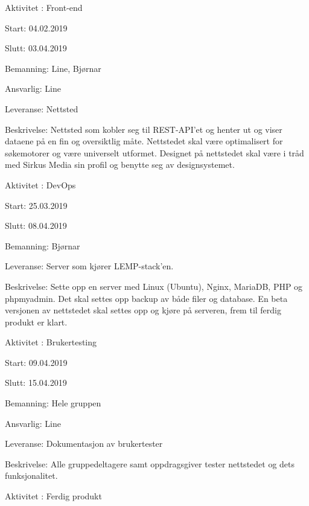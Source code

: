 \documentclass[11pt,a4paper]{report}
\begin{document}
\begin{compactdesc}
\begin{compactitem}
	\addtocounter{aktivitetTeller}{1}
	\end{compactitem}
	\item [Aktivitet \arabic{aktivitetTeller}:] Front-end
	\begin{compactitem}
	\item Start: 04.02.2019
	\item Slutt: 03.04.2019
	\item Bemanning: Line, Bjørnar
	\item Ansvarlig: Line
	\item Leveranse: Nettsted
	\item Beskrivelse: Nettsted som kobler seg til REST-API'et og henter ut og viser dataene på en fin og oversiktlig måte. Nettstedet skal være optimalisert for søkemotorer og være universelt utformet. Designet på nettstedet skal være i tråd med Sirkus Media sin profil og benytte seg av designsystemet.
	\addtocounter{aktivitetTeller}{1}
	\end{compactitem}
	\item [Aktivitet \arabic{aktivitetTeller}:] DevOps
	\begin{compactitem}
	\item Start: 25.03.2019
	\item Slutt: 08.04.2019
	\item Bemanning: Bjørnar
	\item Leveranse: Server som kjører LEMP-stack'en.
	\item Beskrivelse: Sette opp en server med Linux (Ubuntu), Nginx, MariaDB, PHP og phpmyadmin. Det skal settes opp backup av både filer og database. En beta versjonen av nettstedet skal settes opp og kjøre på serveren, frem til ferdig produkt er klart.
	\addtocounter{aktivitetTeller}{1}
	\end{compactitem}
	\item [Aktivitet \arabic{aktivitetTeller}:] Brukertesting
	\begin{compactitem}
	\item Start: 09.04.2019
	\item Slutt: 15.04.2019
	\item Bemanning: Hele gruppen
	\item Ansvarlig: Line
	\item Leveranse: Dokumentasjon av brukertester
	\item Beskrivelse: Alle gruppedeltagere samt oppdragsgiver tester nettstedet og dets funksjonalitet.
	\addtocounter{aktivitetTeller}{1}
	\end{compactitem}
	\item [Aktivitet \arabic{aktivitetTeller}:] Ferdig produkt

\end{compactdesc}
\end{document}
